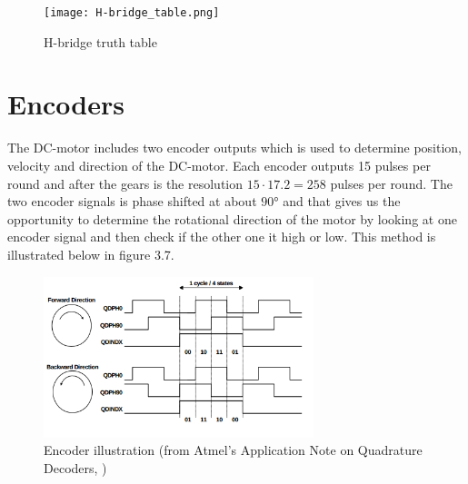   \begin{figure}[!h!]
	\centering
	\texttt{[image: H-bridge\_table.png]}
	\caption{H-bridge truth table}
	\label{fig:intro_4}
\end{figure}

\section{Encoders}
  The DC-motor includes two encoder outputs which is used to determine position, velocity and direction of the DC-motor.
  Each encoder outputs 15 pulses per round and after the gears is the resolution $15 \cdot 17.2 = 258$ pulses per round.
  The two encoder signals is phase shifted at about $\ang{90}$ and that gives us the opportunity to determine the rotational direction of the motor by looking at one encoder signal and then check if the other one it high or low. This method is illustrated below in figure 3.7.
   
  \begin{figure}[!h!]
	\centering
	\includegraphics[width=0.7\textwidth]{resources/encoder_atmel.png}
	\caption{Encoder illustration (from Atmel's Application Note on Quadrature Decoders, \citep{avr1600})}
	\label{fig:5}
\end{figure}

